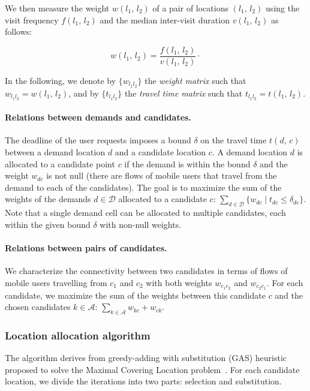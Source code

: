 We then measure the weight $w(l_1,\,l_2)$ of a pair of locations $(l_1,\,l_2)$ using the visit frequency $f(l_1,\,l_2)$ and the median inter-visit duration $v(l_1,\,l_2)$ as follows:

\begin{equation}
w(l_1,\,l_2) = \frac{f(l_1,\,l_2)}{v(l_1,\,l_2)}\cdot
\end{equation}

In the following, we denote by $\{w_{l_1l_2}\}$  the \textit{weight matrix} such that $w_{l_1l_2} = w(l_1,\,l_2)$, and by $\{t_{l_1l_2}\}$ the \textit{travel time matrix} such that $t_{l_1l_2} = t(l_1,\,l_2)$.


\paragraph{Relations between demands and candidates.} 
The deadline of the user requests imposes a bound $\delta$ on the travel time $t(d,\,c)$ between a demand location $d$ and a candidate location $c$. A demand location $d$ is allocated to a candidate point $c$ if the demand is within the bound $\delta$ and the weight $w_{dc}$ is not null (\ie there are flows of mobile users that travel from the demand to each of the candidates). The goal is to maximize the sum of the weights of the demands $d\in\mathcal{D}$ allocated to a candidate $c$: $\sum_{d\in\mathcal{D}}\{w_{dc}\mid t_{dc} \leq \delta_{dc}\}$. Note that a single demand cell can be allocated to multiple candidates, each within the given bound $\delta$ with non-null weights. 

\paragraph{Relations between pairs of candidates.} 
We characterize the connectivity between two candidates in terms of flows of mobile users travelling from $c_1$ and $c_2$ with both weights $w_{c_1c_2}$ and $w_{c_2c_1}$. For each candidate, we maximize the sum of the weights between this candidate $c$ and the chosen candidates $k\in\mathcal{A}$: $\sum_{k\in\mathcal{A}}w_{kc} + w_{ck}$.


\subsubsection{Location allocation algorithm}

The algorithm derives from greedy-adding with substitution (GAS) heuristic proposed to solve the Maximal Covering Location problem~\cite{church1974maximal}. For each candidate location, we divide the iterations into two parts: selection and substitution. 

